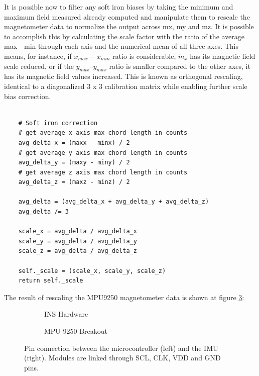 It is possible now to filter any soft iron biases by taking the minimum and maximum field measured already computed and manipulate them to rescale the magnetometer data to normalize the output across mx, my and mz. It is possible to accomplish this by calculating the scale factor with the ratio of the average max - min through each axis and the numerical mean of all three axes. This means, for instance, if $x_{max} - x_{min}$ ratio is considerable, $\widetilde{m}_x$ has its magnetic field scale reduced, or if the $y_{max} – y_{max}$ ratio is smaller compared to the other axes, it has its magnetic field values increased. This is known as orthogonal rescaling, identical to a diagonalized 3 x 3 calibration matrix while enabling further scale bias correction.

\lstset{language=Python}
\begin{lstlisting}[frame=single]  % Start your code-block

    # Soft iron correction
    # get average x axis max chord length in counts
    avg_delta_x = (maxx - minx) / 2
    # get average y axis max chord length in counts
    avg_delta_y = (maxy - miny) / 2
    # get average z axis max chord length in counts
    avg_delta_z = (maxz - minz) / 2

    avg_delta = (avg_delta_x + avg_delta_y + avg_delta_z)
    avg_delta /= 3

    scale_x = avg_delta / avg_delta_x
    scale_y = avg_delta / avg_delta_y
    scale_z = avg_delta / avg_delta_z

    self._scale = (scale_x, scale_y, scale_z)
    return self._scale

\end{lstlisting}

The result of rescaling the MPU9250 magnetometer data is shown at figure \ref{fig:mag_calibration_output}:

\begin{figure}[!h]
    \centering
    \begin{subfigure}{0.49\textwidth}
        \centering
        \resizebox{1\linewidth}{!}{}
        \caption{INS Hardware}
        \label{fig:sub1}
    \end{subfigure}
    \begin{subfigure}{0.49\textwidth}
        \centering
        \resizebox{1\linewidth}{!}{}
        \caption{MPU-9250 Breakout}
        \label{fig:sub2}
    \end{subfigure}
    \caption{Pin connection between the microcontroller (left) and the IMU (right). Modules are linked through SCL, CLK, VDD and GND pins.}
    \label{fig:mag_calibration_output}
\end{figure}

